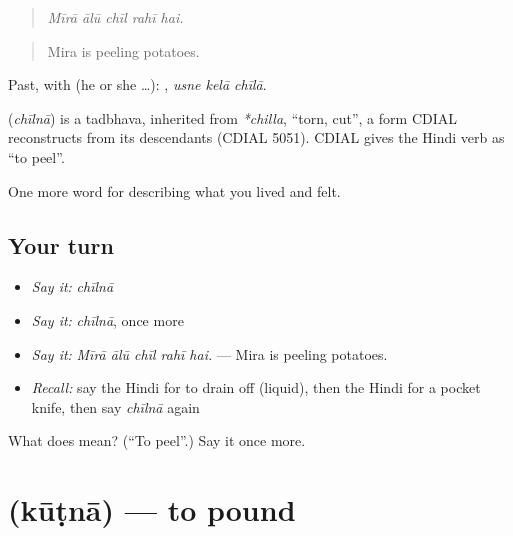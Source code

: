 \begin{quote}
    
\end{quote}

\begin{quote}
\emph{Mīrā ālū chīl rahī hai.}
\end{quote}

\begin{quote}
Mira is peeling potatoes.
\end{quote}

Past, with  (he or she …):   , \emph{usne kelā chīlā}.

\begin{cousinweb}
\textbf{} (\emph{chīlnā}) is a tadbhava, inherited from \emph{*chilla}, \textquotedblleft{}torn, cut\textquotedblright{}, a form CDIAL reconstructs from its descendants (CDIAL 5051). CDIAL gives the Hindi verb as \textquotedblleft{}to peel\textquotedblright{}.
\end{cousinweb}

\begin{grammarlens}[title={What you've built}]
One more word for describing what you lived and felt.
\end{grammarlens}

\subsection*{Your turn}
\begin{itemize}
\raggedright
  \item \emph{Say it:} \emph{chīlnā}
  \item \emph{Say it:} \emph{chīlnā}, once more
  \item \emph{Say it:} \emph{Mīrā ālū chīl rahī hai.} — Mira is peeling potatoes.
  \item \emph{Recall:} say the Hindi for to drain off (liquid), then the Hindi for a pocket knife, then say \emph{chīlnā} again
\end{itemize}

\begin{tcolorbox}[breakable,colback=teal!4,colframe=teal!35!black,title={Before you move on}]
What does  mean? (\textquotedblleft{}To peel\textquotedblright{}.) Say it once more.
\end{tcolorbox}
\section[\texorpdfstring{\hi{कूटना} (kūṭnā)}{कूटना (kūṭnā)}]{ (kūṭnā) — to pound}

